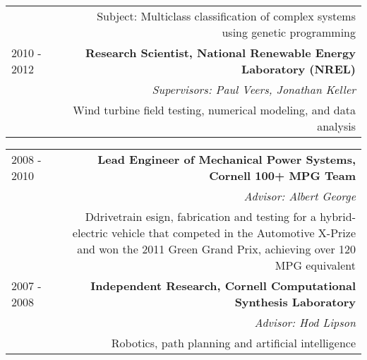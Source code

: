 \begin{tabular}{L!{\VRule}R}
& Subject: Multiclass classification of complex systems using genetic programming \\
2010 - 2012& {\bf Research Scientist, National Renewable Energy Laboratory (NREL)} \\
& {\it Supervisors: Paul Veers, Jonathan Keller} \\
& Wind turbine field testing, numerical modeling, and data analysis
\end{tabular}

\noindent \begin{tabular}{L!{\VRule}R}
2008 - 2010& {\bf Lead Engineer of Mechanical Power Systems, Cornell 100+ MPG Team} \\
& {\it Advisor: Albert George} \\
& Ddrivetrain esign, fabrication and testing for a hybrid-electric vehicle that competed in the Automotive X-Prize and won the 2011 Green Grand Prix, achieving over 120 MPG equivalent\\
2007 - 2008& {\bf Independent Research, Cornell Computational Synthesis Laboratory} \\
& {\it Advisor: Hod Lipson}\\
&Robotics, path planning and artificial intelligence \\
\end{tabular}
